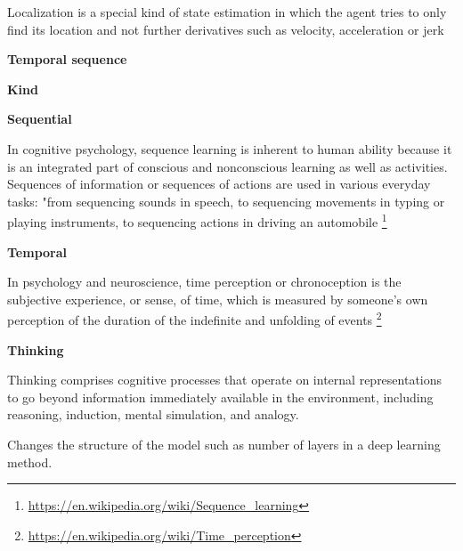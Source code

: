 \documentclass{book}
\providecommand{\ProjectDeepHeading}[2]{%
    \par\medskip\noindent\textbf{#2}\par\smallskip
}
\providecommand{\seeherefooter}[1]{\footnote{\url{#1}}}
\begin{document}

Localization is a special kind of state estimation in which the agent tries to only find its location and not further derivatives such as velocity, acceleration or jerk

\ProjectDeepHeading{5}{Temporal sequence}

\ProjectDeepHeading{6}{Kind}

\ProjectDeepHeading{7}{Sequential}


In cognitive psychology, sequence learning is inherent to human ability because it is an integrated part of conscious and nonconscious learning as well as activities. Sequences of information or sequences of actions are used in various everyday tasks: "from sequencing sounds in speech, to sequencing movements in typing or playing instruments, to sequencing actions in driving an automobile \seeherefooter{https://en.wikipedia.org/wiki/Sequence_learning}

\ProjectDeepHeading{7}{Temporal}


In psychology and neuroscience, time perception or chronoception is the subjective experience, or sense, of time, which is measured by someone's own perception of the duration of the indefinite and unfolding of events \seeherefooter{https://en.wikipedia.org/wiki/Time_perception}


\ProjectDeepHeading{10}{Thinking}

               \cite{markman-2001-thinking}
               Thinking comprises cognitive processes that operate on internal representations to go beyond information immediately available in the environment, including reasoning, induction, mental simulation, and analogy.

               Changes the structure of the model such as number of layers in a deep learning method.
\end{document}
